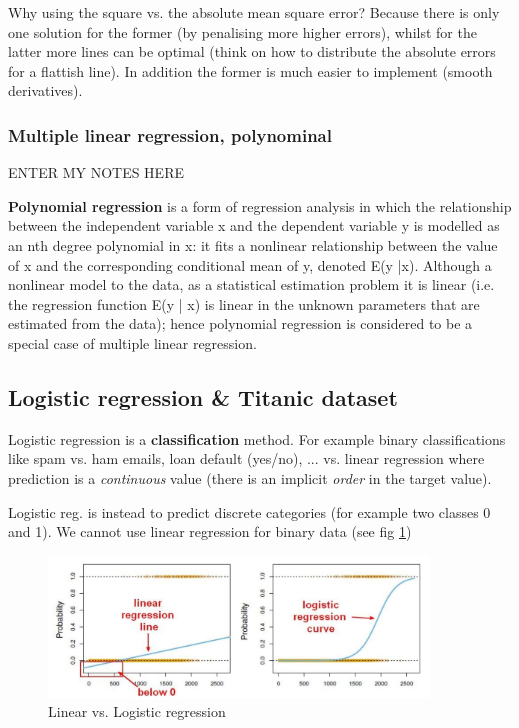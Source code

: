 \documentclass[11pt]{article}
\begin{document}
Why using the square vs. the absolute mean square error? Because there is only one solution for the former (by penalising more higher errors), whilst for the latter more lines can be optimal (think on how to distribute the absolute errors for a flattish line). In addition the former is much easier to implement (smooth derivatives).


\subsubsection{Multiple linear regression, polynominal} 
ENTER MY NOTES HERE

\textbf{Polynomial regression} is a form of regression analysis in which the relationship between the independent variable x and the dependent variable y is modelled as an nth degree polynomial in x: it  fits a nonlinear relationship between the value of x and the corresponding conditional mean of y, denoted E(y |x). Although a nonlinear model to the data, as a statistical estimation problem it is linear (i.e. the regression function E(y | x) is linear in the unknown parameters that are estimated from the data); hence polynomial regression is considered to be a special case of multiple linear regression.

\subsection{Logistic regression \& Titanic dataset} \label{titanic}
Logistic regression is a \textbf{classification} method. For example binary classifications like spam vs. ham emails, loan default (yes/no), ... 
vs. linear regression where prediction is a \textit{continuous} value (there is an implicit \textit{order} in the target value). 

Logistic reg. is instead to predict discrete categories (for example two classes 0 and 1). We cannot use linear regression for binary data (see fig \ref{lin_log_regr})


\begin{figure}[htbp] 
	\centering
	\includegraphics[width=0.9\textwidth]{pics/logistic_regression}
	\caption{Linear vs. Logistic regression} 
	\label{lin_log_regr}
\end{figure}
\end{document}
